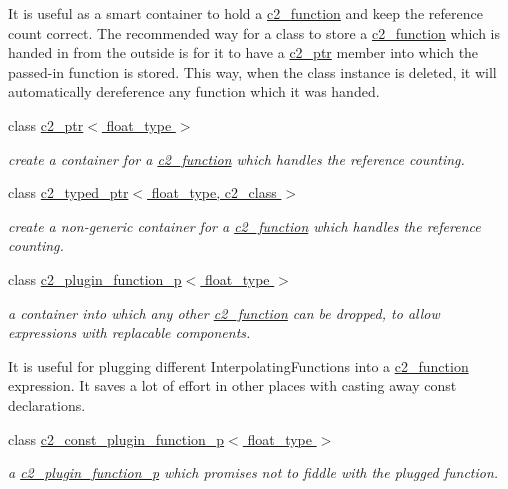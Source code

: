 \begin{DoxyCompactItemize}
\begin{DoxyCompactList}
It is useful as a smart container to hold a \hyperlink{classc2__function}{c2\+\_\+function} and keep the reference count correct. The recommended way for a class to store a \hyperlink{classc2__function}{c2\+\_\+function} which is handed in from the outside is for it to have a \hyperlink{classc2__ptr}{c2\+\_\+ptr} member into which the passed-\/in function is stored. This way, when the class instance is deleted, it will automatically dereference any function which it was handed. \end{DoxyCompactList}\item 
class \hyperlink{classc2__ptr}{c2\+\_\+ptr$<$ float\+\_\+type $>$}
\begin{DoxyCompactList}\small\item\em create a container for a \hyperlink{classc2__function}{c2\+\_\+function} which handles the reference counting. \end{DoxyCompactList}\item 
class \hyperlink{classc2__typed__ptr}{c2\+\_\+typed\+\_\+ptr$<$ float\+\_\+type, c2\+\_\+class $>$}
\begin{DoxyCompactList}\small\item\em create a non-\/generic container for a \hyperlink{classc2__function}{c2\+\_\+function} which handles the reference counting. \end{DoxyCompactList}\item 
class \hyperlink{classc2__plugin__function__p}{c2\+\_\+plugin\+\_\+function\+\_\+p$<$ float\+\_\+type $>$}
\begin{DoxyCompactList}\small\item\em a container into which any other \hyperlink{classc2__function}{c2\+\_\+function} can be dropped, to allow expressions with replacable components.

It is useful for plugging different Interpolating\+Functions into a \hyperlink{classc2__function}{c2\+\_\+function} expression. It saves a lot of effort in other places with casting away const declarations. \end{DoxyCompactList}\item 
class \hyperlink{classc2__const__plugin__function__p}{c2\+\_\+const\+\_\+plugin\+\_\+function\+\_\+p$<$ float\+\_\+type $>$}
\begin{DoxyCompactList}\small\item\em a \hyperlink{classc2__plugin__function__p}{c2\+\_\+plugin\+\_\+function\+\_\+p} which promises not to fiddle with the plugged function.


\end{DoxyCompactList}
\end{DoxyCompactItemize}
